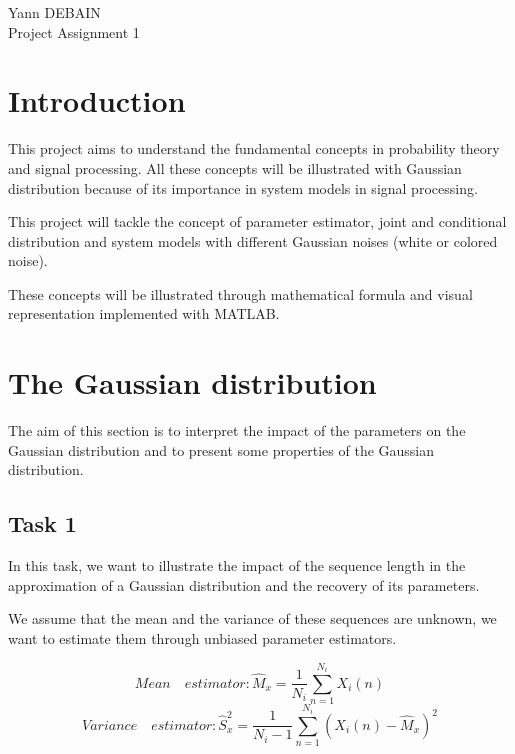 \documentclass[onecolumn, 12pt]{IEEEtran}
\begin{document}
\begin{center}
\Large{Yann DEBAIN} \\
\LARGE{Project Assignment 1} \\
\end{center}

\vspace{0.5cm}

\section{Introduction}
This project aims to understand the fundamental concepts in probability theory and signal processing. All these concepts will be illustrated with Gaussian distribution because of its importance in system models in signal processing.

This project will tackle the concept of parameter estimator, joint and conditional distribution and system models with different Gaussian noises (white or colored noise). 

These concepts will be illustrated through mathematical formula and visual representation implemented with MATLAB.

\section{The Gaussian distribution}

The aim of this section is to interpret the impact of the parameters on the Gaussian distribution and to present some properties of the Gaussian distribution.

\subsection*{Task 1}
In this task, we want to illustrate the impact of the sequence length in the approximation of a Gaussian distribution and the recovery of its parameters.
\newline

We assume that the mean and the variance of these sequences are unknown, we want to estimate them through unbiased parameter estimators.

\begin{equation} \label{eq:Eq1}
Mean\quad estimator : \hat{M}_x = \frac{1}{N_i}\sum_{n = 1}^{N_i}{X_i(n)}
\end{equation}
\begin{equation} \label{eq:Eq2}
Variance\quad estimator : \hat{S}_{x}^2 = \frac{1}{N_i - 1}\sum_{n = 1}^{N_i}{(X_i(n) - \hat{M}_x)^2}
\end{equation}
\end{document}
